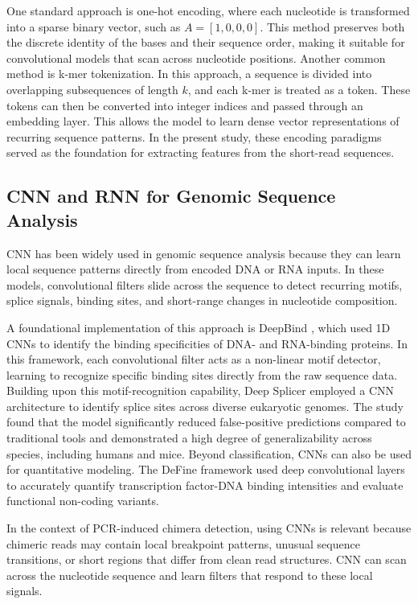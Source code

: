 One standard approach is one-hot encoding, where each nucleotide is transformed into a sparse binary vector, such as \(A = [1, 0, 0, 0]\). This method preserves both the discrete identity of the bases and their sequence order, making it suitable for convolutional models that scan across nucleotide positions. Another common method is k-mer tokenization. In this approach, a sequence is divided into overlapping subsequences of length \(k\), and each k-mer is treated as a token. These tokens can then be converted into integer indices and passed through an embedding layer. This allows the model to learn dense vector representations of recurring sequence patterns. In the present study, these encoding paradigms served as the foundation for extracting features from the short-read sequences.

\subsection{CNN and RNN for Genomic Sequence Analysis}

CNN has been widely used in genomic sequence analysis because they can learn local sequence patterns directly from encoded DNA or RNA inputs. In these models, convolutional filters slide across the sequence to detect recurring motifs, splice signals, binding sites, and short-range changes in nucleotide composition.

A foundational implementation of this approach is DeepBind \citep{Alipanahi2015}, which used 1D CNNs to identify the binding specificities of DNA- and RNA-binding proteins. In this framework, each convolutional filter acts as a non-linear motif detector, learning to recognize specific binding sites directly from the raw sequence data. Building upon this motif-recognition capability, Deep Splicer \citep{FernandezCastillo2022} employed a CNN architecture to identify splice sites across diverse eukaryotic genomes. The study found that the model significantly reduced false-positive predictions compared to traditional tools and demonstrated a high degree of generalizability across species, including humans and mice. Beyond classification, CNNs can also be used for quantitative modeling. The DeFine framework \citep{Wang2018} used deep convolutional layers to accurately quantify transcription factor-DNA binding intensities and evaluate functional non-coding variants.

In the context of PCR-induced chimera detection, using CNNs is relevant because chimeric reads may contain local breakpoint patterns, unusual sequence transitions, or short regions that differ from clean read structures. CNN can scan across the nucleotide sequence and learn filters that respond to these local signals.

